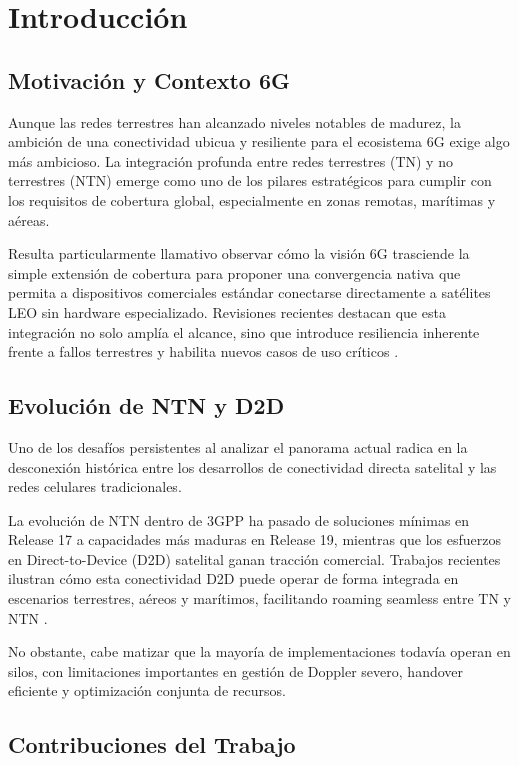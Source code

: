 \section{Introducción}

\subsection{Motivación y Contexto 6G}

Aunque las redes terrestres han alcanzado niveles notables de madurez, la ambición de una conectividad ubicua y resiliente para el ecosistema 6G exige algo más ambicioso. La integración profunda entre redes terrestres (TN) y no terrestres (NTN) emerge como uno de los pilares estratégicos para cumplir con los requisitos de cobertura global, especialmente en zonas remotas, marítimas y aéreas.

Resulta particularmente llamativo observar cómo la visión 6G trasciende la simple extensión de cobertura para proponer una convergencia nativa que permita a dispositivos comerciales estándar conectarse directamente a satélites LEO sin hardware especializado. Revisiones recientes destacan que esta integración no solo amplía el alcance, sino que introduce resiliencia inherente frente a fallos terrestres y habilita nuevos casos de uso críticos \cite{Wang2025_NTN6G}.

\subsection{Evolución de NTN y D2D}

Uno de los desafíos persistentes al analizar el panorama actual radica en la desconexión histórica entre los desarrollos de conectividad directa satelital y las redes celulares tradicionales. 

La evolución de NTN dentro de 3GPP ha pasado de soluciones mínimas en Release 17 a capacidades más maduras en Release 19, mientras que los esfuerzos en Direct-to-Device (D2D) satelital ganan tracción comercial. Trabajos recientes ilustran cómo esta conectividad D2D puede operar de forma integrada en escenarios terrestres, aéreos y marítimos, facilitando roaming seamless entre TN y NTN \cite{Ullah2026_D2D}.

No obstante, cabe matizar que la mayoría de implementaciones todavía operan en silos, con limitaciones importantes en gestión de Doppler severo, handover eficiente y optimización conjunta de recursos.

\subsection{Contribuciones del Trabajo}

